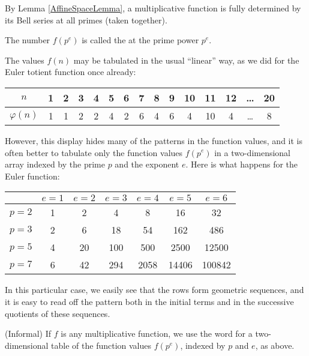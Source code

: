 \documentclass[a4paper]{article}
\begin{document}
\begin{remark}
By Lemma \ref{AffineSpaceLemma}, a multiplicative function is fully determined by its Bell series at all primes (taken together).
\end{remark}

\begin{definition}
The number $f(p^e)$ is called the  at the prime power $p^e$.
\end{definition}

The values $f(n)$ may be tabulated in the usual ``linear'' way, as we did for the Euler totient function once already:

\vspace{6pt}
\begin{tabular}{  | c || c | c | c | c | c | c | c | c | c | c | c | c | c | c |  }
  \hline			
  $n$ & 1 & 2 & 3 & 4 & 5 & 6 & 7 & 8 & 9 & 10 & 11 & 12 & \ldots & 20  \\
  \hline
  $\varphi(n) $ & 1 & 1 & 2 & 2 & 4 & 2 & 6 & 4 & 6 & 4 & 10 & 4 & \ldots & 8  \\
  \hline  
\end{tabular}
\vspace{6pt}

However, this display hides many of the patterns in the function values, and it is often better to tabulate only the function values $f(p^e)$ in a two-dimensional array indexed by the prime $p$ and the exponent $e$. Here is what happens for the Euler function:

\begin{center}
\begin{tabular}{| l | | c | c | c | c | c | c |}
\hline
& $e = 1$ & $e = 2$ & $e = 3$ & $e = 4$ & $e = 5$ & $e = 6$ \\
\hline
\hline
$p = 2$ & 1 & 2 & 4 & 8 & 16 & 32 \\
\hline
$p = 3$ & 2 & 6 & 18 & 54 & 162 & 486 \\
\hline
$p = 5$ & 4 & 20 & 100 & 500 & 2500 & 12500 \\
\hline
$p = 7$ & 6 & 42 & 294 & 2058 & 14406 & 100842 \\
\hline
\end{tabular}
\end{center}

In this particular case, we easily see that the rows form geometric sequences, and it is easy to read off the pattern both in the initial terms and in the successive quotients of these sequences. 

\begin{definition}
(Informal) If $f$ is any multiplicative function, we use the word  for a two-dimensional table of the function values $f(p^e)$, indexed by $p$ and $e$, as above.
\end{definition}
\end{document}
